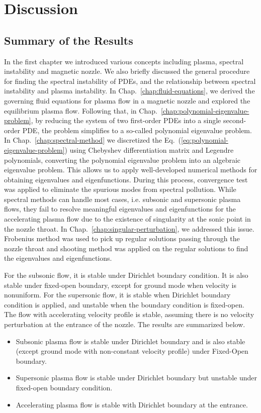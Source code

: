 \chapter{Discussion} \label{chap:discussion}
\section{Summary of the Results}
In the first chapter we introduced various concepts including plasma, spectral instability and magnetic nozzle. We also briefly discussed the general procedure for finding the spectral instability of PDEs, and the relationship between spectral instability and plasma instability. In Chap.~\ref{chap:fluid-equations}, we derived the governing fluid equations for plasma flow in a magnetic nozzle and explored the equilibrium plasma flow. Following that, in Chap.~\ref{chap:polynomial-eigenvalue-problem}, by reducing the system of two first-order PDEs into a single second-order PDE, the problem simplifies to a so-called polynomial eigenvalue problem. In Chap.~\ref{chap:spectral-method} we discretized the Eq.~(\ref{eq:polynomial-eigenvalue-problem}) using Chebyshev differentiation matrix and Legendre polynomials, converting the polynomial eigenvalue problem into an algebraic eigenvalue problem. This allows us to apply well-developed numerical methods for obtaining eigenvalues and eigenfunctions. During this process, convergence test was applied to eliminate the spurious modes from spectral pollution. While spectral methods can handle most cases, i.e. subsonic and supersonic plasma flows, they fail to resolve meaningful eigenvalues and eigenfunctions for the accelerating plasma flow due to the existence of singularity at the sonic point in the nozzle throat. In Chap.~\ref{chap:singular-perturbation}, we addressed this issue. Frobenius method was used to pick up regular solutions passing through the nozzle throat and shooting method was applied on the regular solutions to find the eigenvalues and eigenfunctions.

For the subsonic flow, it is stable under Dirichlet boundary condition. It is also stable under fixed-open boundary, except for ground mode when velocity is nonuniform. For the supersonic flow, it is stable when Dirichlet boundary condition is applied, and unstable when the boundary condition is fixed-open. The flow with accelerating velocity profile is stable, assuming there is no velocity perturbation at the entrance of the nozzle. The results are summarized below.

\begin{itemize}
	\item Subsonic plasma flow is stable under Dirichlet boundary and is also stable (except ground mode with non-constant velocity profile) under Fixed-Open boundary.
	\item Supersonic plasma flow is stable under Dirichlet boundary but unstable under fixed-open boundary condition.
	\item Accelerating plasma flow is stable with Dirichlet boundary at the entrance.
\end{itemize}

